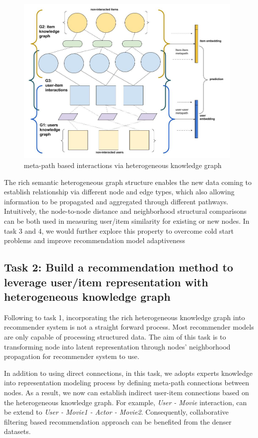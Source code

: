 \begin{figure}[!ht]
    \centering
    \includegraphics[width=0.98\textwidth]{figs/meta-embedding.jpg}
    \caption{meta-path based interactions via heterogeneous knowledge graph}\label{fig:meta_task}
\end{figure}

The rich semantic heterogeneous graph structure enables the new data coming to establish relationship via different node and edge types, which also allowing information to be propagated and aggregated through different pathways. 
Intuitively, the node-to-node distance and neighborhood structural comparisons can be both used in measuring user/item similarity for existing or new nodes. In task 3 and 4, we would further explore this property to overcome cold start problems and improve recommendation model adaptiveness


\subsection*{Task 2: Build a recommendation method to leverage user/item representation with heterogeneous knowledge graph}

Following to task 1, incorporating the rich heterogeneous knowledge graph into recommender system is not a straight forward process. Most recommender models are only capable of processing structured data. The aim of this task is to transforming node into latent representation through nodes' neighborhood propagation for recommender system to use.

In addition to using direct connections, in this task, we adopts experts knowledge into representation modeling process by defining meta-path connections between nodes. As a result, we now can establish indirect user-item connections based on the heterogeneous knowledge graph. For example, \textit{User - Movie} interaction, can be extend to \textit{User - Movie1 - Actor - Movie2}. Consequently, collaborative filtering based recommendation approach can be benefited from the denser datasets.

